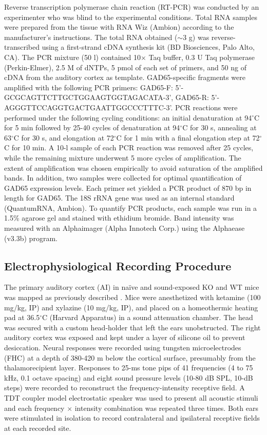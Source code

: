 Reverse transcription polymerase chain reaction (RT-PCR) was conducted by an experimenter who was blind to the experimental conditions. Total RNA samples were prepared from the tissue with RNA Wiz (Ambion) according to the manufacturer's instructions. The total RNA obtained ($\sim$3 \textmu g) was reverse-transcribed using a first-strand cDNA synthesis kit (BD Biosciences, Palo Alto, CA). The PCR mixture (50 \textmu l) contained 10$\times$ Taq buffer, 0.3 U Taq polymerase (Perkin-Elmer), 2.5 \textmu M of dNTPs, 5 pmol of each set of primers, and 50 ng of cDNA from the auditory cortex as template. GAD65-specific fragments were amplified with the following PCR primers: GAD65-F: 5'-GCGCAGTTCTTGCTGGAAGTGGTAGACATA-3', GAD65-R: 5'-AGGGTTCCAGGTGACTGAATTGGCCCTTTC-3'. PCR reactions were performed under the following cycling conditions: an initial denaturation at 94$^\circ$C for 5 min followed by 25-40 cycles of denaturation at 94$^\circ$C for 30 s, annealing at 63$^\circ$C for 30 s, and elongation at 72$^\circ$C for 1 min with a final elongation step at 72$^\circ$C for 10 min. A 10-\textmu l sample of each PCR reaction was removed after 25 cycles, while the remaining mixture underwent 5 more cycles of amplification. The extent of amplification was chosen empirically to avoid saturation of the amplified bands. In addition, two samples were collected for optimal quantification of GAD65 expression levels. Each primer set yielded a PCR product of 870 bp in length for GAD65. The 18S rRNA gene was used as an internal standard (QuantumRNA, Ambion). To quantify PCR products, each sample was run in a 1.5\% agarose gel and stained with ethidium bromide. Band intensity was measured with an Alphaimager (Alpha Innotech Corp.) using the Alphaease (v3.3b) program.

\subsection{Electrophysiological Recording Procedure}
The primary auditory cortex (AI) in na\"ive and sound-exposed KO and WT mice was mapped as previously described \cite{Kim2009, Yang2013}. Mice were anesthetized with ketamine (100 mg/kg, IP) and xylazine (10 mg/kg, IP), and placed on a homeothermic heating pad at 36.5$^\circ$C (Harvard Apparatus) in a sound attenuation chamber. The head was secured with a custom head-holder that left the ears unobstructed. The right auditory cortex was exposed and kept under a layer of silicone oil to prevent desiccation. Neural responses were recorded using tungsten microelectrodes (FHC) at a depth of 380-420 \textmu m below the cortical surface, presumably from the thalamorecipient layer. Responses to 25-ms tone pips of 41 frequencies (4 to 75 kHz, 0.1 octave spacing) and eight sound pressure levels (10-80 dB SPL, 10-dB steps) were recorded to reconstruct the frequency-intensity receptive field. A TDT coupler model electrostatic speaker was used to present all acoustic stimuli and each frequency $\times$ intensity combination was repeated three times. Both ears were stimulated in isolation to record contralateral and ipsilateral receptive fields at each recorded site.

